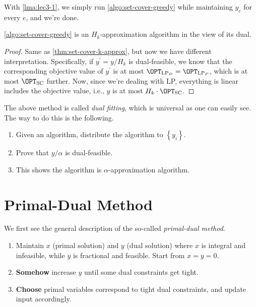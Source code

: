With \autoref{lma:lec3-1}, we simply run \autoref{algo:set-cover-greedy} while maintaining \(y_e\) for every \(e\), and we're done.

\begin{theorem}
	\autoref{algo:set-cover-greedy} is an \(H_k\)-approximation algorithm in the view of its dual.
\end{theorem}
\begin{proof}
	Same as \autoref{thm:set-cover-k-approx}, but now we have different interpretation. Specifically, if \(y^\prime = y / H_k\) is dual-feasible, we know that the corresponding objective value of \(y^\prime \) is at most \(\OPT_{\mathrm{LP}_D} = \OPT_{\mathrm{LP}_P}\), which is at most \(\OPT_{\mathrm{SC}}\) further. Now, since we're dealing with LP, everything is linear includes the objective value, i.e., \(y\) is at most \(H_k\cdot \OPT_{\mathrm{SC}}\).
\end{proof}

\begin{remark}\label{rmk:dual-fitting}
	The above method is called \emph{dual fitting}, which is universal as one can easily see. The way to do this is the following.
	\begin{enumerate}
		\item Given an algorithm, distribute the algorithm to \(\left\{ y_i \right\}\).
		\item Prove that \(y / \alpha \) is dual-feasible.
		\item This shows the algorithm is \(\alpha\)-approximation algorithm.
	\end{enumerate}
\end{remark}

\section{Primal-Dual Method}

We first see the general description of the so-called \emph{primal-dual method}.

\begin{enumerate}
	\item Maintain \(x\) (primal solution) and \(y\) (dual solution) where \(x\) is integral and infeasible, while \(y\) is fractional and feasible. Start from \(x = y = 0\).
	\item \textbf{Somehow} increase \(y\) until some dual constraints get tight.
	\item \textbf{Choose} primal variables correspond to tight dual constraints, and update input accordingly.
\end{enumerate}

